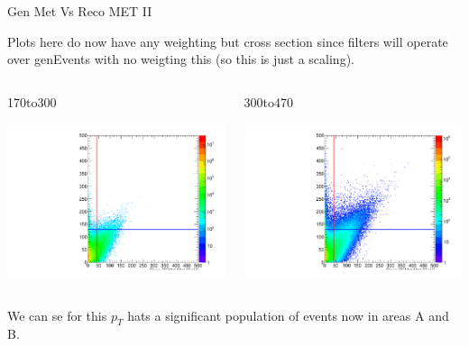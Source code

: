 \documentclass[8pt]{beamer}
\begin{document}
\begin{frame}{Gen Met Vs Reco MET II}

Plots here do now have any weighting but cross section since filters will operate over genEvents with no weigting this (so this is just a scaling).

\begin{columns}

\begin{block}{170to300}
 
\includegraphics[width=\linewidth]{img/MC_QCD-Pt-170to300-pythia6_GenVsReco_met}
 
\end{block}


\begin{block}{300to470}
 
\includegraphics[width=\linewidth]{img/MC_QCD-Pt-300to470-pythia6_GenVsReco_met}

\end{block}

\end{columns}

We can se for this $p_T$ hats a significant population of events now in areas A and B.

\end{frame}
\end{document}
